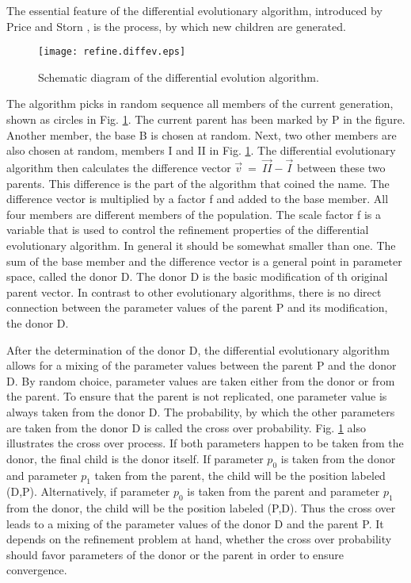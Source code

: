 The essential feature of the differential evolutionary algorithm, 
introduced by Price and Storn \cite{prstla2005}, is the process, by which
new children are generated.

\begin{figure}[htbp]
   \texttt{[image: refine.diffev.eps]}
   \caption{Schematic diagram of the differential evolution algorithm.}
   \label{evo-select}
\end{figure}

The algorithm picks in random sequence all members of the current 
generation, shown as circles in Fig. \ref{evo-select}. The current
parent has been marked by P in the figure. Another member, the base B 
is chosen at random. Next, two other members are also 
chosen at random, members I and II in Fig. \ref{evo-select}. The
differential evolutionary algorithm then calculates the difference vector
$\vec{v} ~=~ \vec{II} - \vec{I}$ between these two parents. This difference
is the part of the algorithm that coined the name. The difference vector
is multiplied by a factor f and added to the base member. 
All four members are different members of the population. The
scale factor f is a variable that is used to control the refinement
properties of the differential evolutionary algorithm. In general it
should be somewhat smaller than one. The sum of the base member and the
difference vector is a general point in parameter space, called the 
donor D. The donor D is the basic modification of th original parent
vector. In contrast to other evolutionary algorithms, there is no
direct connection between the parameter values of the parent P and its
modification, the donor D. 

After the determination of the donor D, the differential evolutionary
algorithm allows for a mixing of the parameter values between the 
parent P and the donor D. By random choice, parameter values are taken
either from the donor or from the parent. To ensure that the parent 
is not replicated, one parameter value is always taken from the 
donor D. The probability, by which the other parameters are taken from 
the donor D is called the cross over probability. Fig. 
\ref{evo-select} also illustrates the cross over process. If 
both parameters happen to be taken from the donor, the final child is the
donor itself. If parameter $p_{0}$ is taken from the donor and 
parameter $p_{1}$ taken from the parent, the child will be the position
labeled (D,P). Alternatively, if parameter $p_{0}$ is taken from the 
parent and parameter $p_{1}$ from the donor, the child will be the
position labeled (P,D). Thus the cross over leads to a mixing of 
the parameter values of the donor D and the parent P. It depends on the
refinement problem at hand, whether the cross over probability should 
favor parameters of the donor or the parent in order to ensure convergence. 

